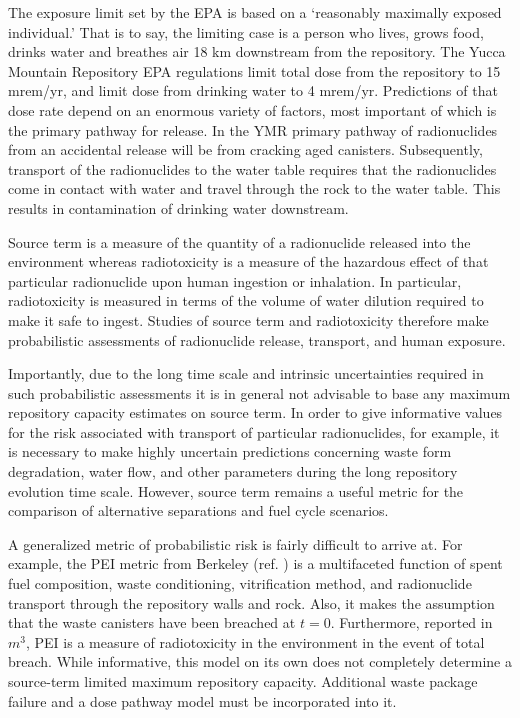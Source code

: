 The exposure limit set by the \gls{EPA} is based on a `reasonably maximally 
exposed individual.' That is to say, the limiting case is a person who lives, 
grows food, drinks water and breathes air 18 km downstream from the repository. 
The Yucca Mountain Repository \gls{EPA} regulations limit total dose from the 
repository to 15 mrem/yr, and limit dose from drinking water to 4 mrem/yr.  
Predictions of that dose rate depend on an enormous variety of factors, most 
important of which is the primary pathway for release. In the \gls{YMR} primary 
pathway of radionuclides from an accidental release will be from cracking aged 
canisters. Subsequently, transport of the radionuclides to the water table 
requires that the radionuclides come in contact with water and travel through 
the rock to the water table. This results in contamination of drinking water 
downstream.  

Source term is a measure of the quantity of a radionuclide released into the 
environment whereas radiotoxicity is a measure of the hazardous effect of that 
particular radionuclide upon human ingestion or inhalation.  In particular, 
radiotoxicity is measured in terms of the volume of water dilution required to 
make it safe to ingest. Studies of source term and radiotoxicity therefore make 
probabilistic assessments of radionuclide release, transport, and human 
exposure.  

Importantly, due to the long time scale and intrinsic uncertainties required in 
such probabilistic assessments it is in general not advisable to base any 
maximum repository capacity estimates on source term.
In order to give informative values for the risk associated with transport of 
particular radionuclides, for example, it is necessary to make highly uncertain  
predictions concerning waste form degradation, water flow, and other parameters 
during the long repository evolution time scale.  However, source term remains a 
useful metric for the comparison of alternative separations and fuel cycle 
scenarios.


A generalized metric of probabilistic risk is fairly difficult to arrive at. For 
example, the \gls{PEI} metric from Berkeley (ref.  
\cite{bouvier_comparison_2007}) is a multifaceted function of spent fuel 
composition, waste conditioning, vitrification method, and radionuclide 
transport through the repository walls and rock.  Also, it makes the assumption 
that the waste canisters have been breached at $t=0$. Furthermore, reported in 
$m^3$, PEI is a measure of radiotoxicity in the environment in the event of 
total breach. While informative, this model on its own does not completely 
determine a source-term limited maximum repository capacity.  Additional waste 
package failure and a dose pathway model must be incorporated into it.


